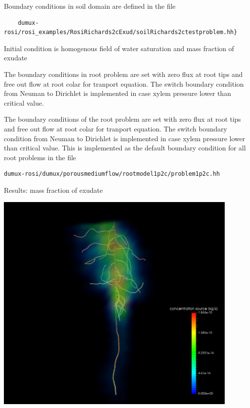 Boundary conditions in soil domain are defined in the file
\begin{lstlisting}
    dumux-rosi/rosi_examples/RosiRichards2cExud/soilRichards2ctestproblem.hh}
\end{lstlisting}



Initial condition is homogenous field of water saturation and mass fraction of exudate



The boundary conditions in root problem are set with zero flux at root tips and free out flow at root colar for tranport equation. The switch boundary condition from Neuman to Dirichlet is implemented in case xylem pressure lower than critical value.

The boundary conditions of the root problem are set with zero flux at root tips and free out flow at root colar for tranport equation. The switch boundary condition from Neuman to Dirichlet is implemented in case xylem pressure lower than critical value. This is implemented as the default boundary condition for all root problems in the file 
\begin{lstlisting}
dumux-rosi/dumux/porousmediumflow/rootmodel1p2c/problem1p2c.hh
\end{lstlisting}



Results: mass fraction of exudate

\noindent\begin{minipage}[c]{1\columnwidth}%
\includegraphics[width=0.9\textwidth]{example_exudates.jpg}%
\end{minipage}

